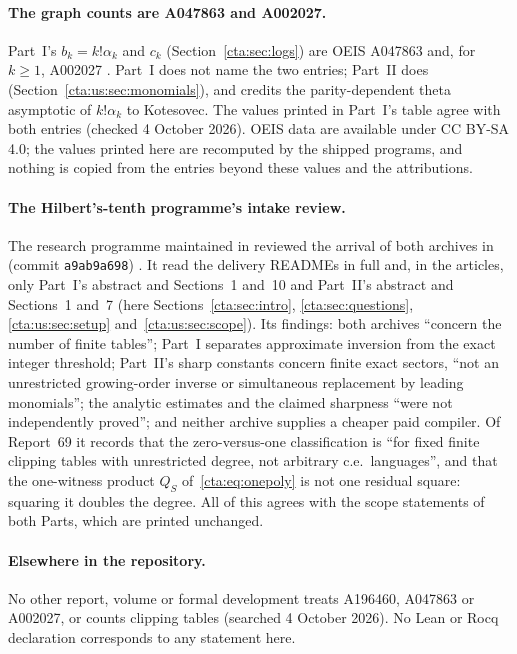 \documentclass[11pt]{article}
\theoremstyle{definition}
\theoremstyle{remark}
\begin{document}
\paragraph{The graph counts are A047863 and A002027.} Part~I's $b_k=k!\alpha_k$
and $c_k$ (Section~\ref{cta:sec:logs}) are OEIS A047863 and, for $k\ge1$,
A002027 \cite{colored,connected}. Part~I does not name the two entries;
Part~II does (Section~\ref{cta:us:sec:monomials}), and credits the
parity-dependent theta asymptotic of $k!\alpha_k$ to Kotesovec. The values
printed in Part~I's table agree with both entries (checked 4 October 2026).
OEIS data are available under CC BY-SA 4.0; the values printed here are
recomputed by the shipped programs, and nothing is copied from the entries
beyond these values and the attributions.

\paragraph{The Hilbert's-tenth programme's intake review.} The research
programme maintained in  reviewed
the arrival of both archives in
(commit \texttt{a9ab9a698}) \cite{htpreview}. It read the delivery READMEs
in full and, in the articles, only Part~I's abstract and Sections~1
and~10 and Part~II's abstract and Sections~1 and~7 (here
Sections~\ref{cta:sec:intro}, \ref{cta:sec:questions},
\ref{cta:us:sec:setup} and~\ref{cta:us:sec:scope}). Its findings: both
archives ``concern the number of finite tables''; Part~I separates
approximate inversion from the exact integer threshold; Part~II's sharp
constants concern finite exact sectors, ``not an unrestricted
growing-order inverse or simultaneous replacement by leading monomials'';
the analytic estimates and the claimed sharpness ``were not independently
proved''; and neither archive supplies a cheaper paid compiler. Of
Report~69 it records that the zero-versus-one classification is ``for
fixed finite clipping tables with unrestricted degree, not arbitrary c.e.\
languages'', and that the one-witness product $Q_S$ of~\eqref{cta:eq:onepoly}
is not one residual square: squaring it doubles the degree. All of this
agrees with the scope statements of both Parts, which are printed
unchanged.

\paragraph{Elsewhere in the repository.} No other report, volume or
formal development treats A196460, A047863 or A002027, or counts clipping
tables (searched 4 October 2026). No Lean or Rocq declaration corresponds
to any statement here.
\end{document}
